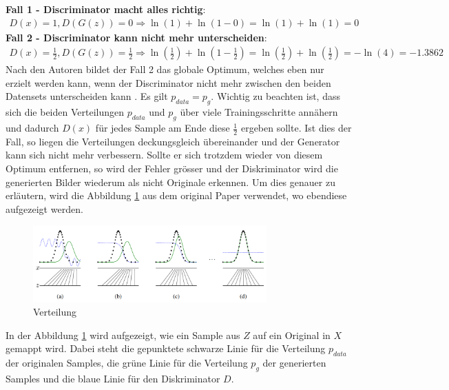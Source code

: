 \textbf{Fall 1 - Discriminator macht alles richtig}:
\begin{align}
    D(x) = 1, D(G(z)) = 0 \Rightarrow \ln(1) + \ln(1 - 0) = \ln(1) + \ln(1) = 0
\end{align}
\textbf{Fall 2 - Discriminator kann nicht mehr unterscheiden}:\\
\begin{align}
    D(x) = \frac{1}{2}, D(G(z)) = \frac{1}{2} \Rightarrow \ln(\frac{1}{2}) + \ln(1 - \frac{1}{2}) = \ln(\frac{1}{2}) + \ln(\frac{1}{2}) = -\ln(4) = -1.3862
\end{align}
Nach den Autoren bildet der Fall 2 das globale Optimum, welches eben nur erzielt werden kann, wenn der Discriminator nicht mehr zwischen
den beiden Datensets unterscheiden kann \cite[p.~4-5]{8253599}. Es gilt $p_{data} = p_{g}$. Wichtig zu beachten ist, dass sich die
beiden Verteilungen $p_{data}$ und $p_g$ über viele Trainingsschritte annähern und dadurch $D(x)$ für jedes Sample am Ende diese
$\frac{1}{2}$ ergeben sollte. Ist dies der Fall, so liegen die Verteilungen deckungsgleich übereinander und der Generator kann sich
nicht mehr verbessern. Sollte er sich trotzdem wieder von diesem Optimum entfernen, so wird der Fehler grösser und der Diskriminator
wird die generierten Bilder wiederum als nicht Originale erkennen. Um dies genauer zu erläutern, wird die Abbildung
\ref{fig:Verteilung} aus dem original Paper verwendet, wo ebendiese aufgezeigt werden.
\begin{figure}[h!]
    \begin{center}
        \includegraphics[width=0.8\textwidth]{../common/02_main/resources/06_verteilung.png}
    \end{center}
    \caption{Verteilung \cite{8253599}}
    \label{fig:Verteilung}
\end{figure}
In der Abbildung \ref{fig:Verteilung} wird aufgezeigt, wie ein Sample aus $Z$ auf ein Original in $X$ gemappt wird.
Dabei steht die gepunktete schwarze Linie für die Verteilung $p_{data}$ der originalen Samples, die grüne Linie für die Verteilung
$p_g$ der generierten Samples und die blaue Linie für den Diskriminator $D$.\\
